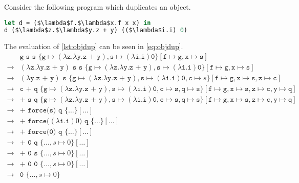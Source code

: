 \documentclass[11pt,oneside,a4paper]{report}
\begin{document}
\clearpage
\begin{exmp}
Consider the following program which duplicates an object.
\begin{lstlisting}[language=ML,caption={Object duplication},label={lst:objdup},mathescape=true]
let d = ($\lambda$f.$\lambda$x.f x x) in
d ($\lambda$z.$\lambda$y.z + y) (($\lambda$i.i) 0)
\end{lstlisting}
The evaluation of \autoref{lst:objdup} can be seen in \autoref{eq:objdup}.
\begin{align}
    \label{eq:objdup}
    &\texttt{g s s }\{ \texttt{g} \mapsto (\lambda \texttt{z}.\lambda \texttt{y}.\texttt{z + y}), \texttt{s} \mapsto (\lambda\texttt{i}.\texttt{i}) \texttt{0} \}[\texttt{f} \mapsto \texttt{g}, \texttt{x} \mapsto \texttt{s}]\\
    \rightarrow &(\lambda \texttt{z}.\lambda \texttt{y}.\texttt{z + y})\texttt{ s s }\{ \texttt{g} \mapsto (\lambda \texttt{z}.\lambda \texttt{y}.\texttt{z + y}), \texttt{s} \mapsto (\lambda\texttt{i}.\texttt{i}) \texttt{0} \}[\texttt{f} \mapsto \texttt{g}, \texttt{x} \mapsto \texttt{s}]\tag*{}\\
    \rightarrow &(\lambda \texttt{y}.\texttt{z + y})\texttt{ s }\{ \texttt{g} \mapsto (\lambda \texttt{z}.\lambda \texttt{y}.\texttt{z + y}), \texttt{s} \mapsto (\lambda\texttt{i}.\texttt{i}) \texttt{0}, \texttt{c} \mapsto s \}[\texttt{f} \mapsto \texttt{g}, \texttt{x} \mapsto \texttt{s}, \texttt{z} \mapsto \texttt{c}]\tag*{}\\
    \rightarrow &\texttt{c + q }\{ \texttt{g} \mapsto (\lambda \texttt{z}.\lambda \texttt{y}.\texttt{z + y}), \texttt{s} \mapsto (\lambda\texttt{i}.\texttt{i}) \texttt{0}, \texttt{c} \mapsto \texttt{s}, \texttt{q} \mapsto \texttt{s}\}[\texttt{f} \mapsto \texttt{g}, \texttt{x} \mapsto \texttt{s}, \texttt{z} \mapsto \texttt{c}, \texttt{y} \mapsto \texttt{q}]\tag*{}\\
    \rightarrow &\texttt{+ s q }\{ \texttt{g} \mapsto (\lambda \texttt{z}.\lambda \texttt{y}.\texttt{z + y}), \texttt{s} \mapsto (\lambda\texttt{i}.\texttt{i}) \texttt{0}, \texttt{c} \mapsto \texttt{s}, \texttt{q} \mapsto \texttt{s}\}[\texttt{f} \mapsto \texttt{g}, \texttt{x} \mapsto \texttt{s}, \texttt{z} \mapsto \texttt{c}, \texttt{y} \mapsto \texttt{q}]\tag*{}\\
    \rightarrow &\texttt{+ force(s) q }\{ \dots \}[\dots]\tag*{}\\
    \rightarrow &\texttt{+ force(}(\lambda\texttt{i}.\texttt{i})0\texttt{) q } \{ \dots \}[\dots]\tag*{}\\
    \rightarrow &\texttt{+ force(0) q }\{ \dots \}[\dots]\tag*{}\\
    \rightarrow &\texttt{+ 0 q }\{ \dots, s \mapsto 0 \}[\dots]\tag*{}\\
    \rightarrow &\texttt{+ 0 s }\{ \dots, s \mapsto 0 \}[\dots]\tag*{}\\
    \rightarrow &\texttt{+ 0 0 }\{ \dots, s \mapsto 0 \}[\dots]\tag*{}\\
    \rightarrow &\texttt{0 }\{ \dots, s \mapsto 0 \}\tag*{}
\end{align}
\end{exmp}
\end{document}
